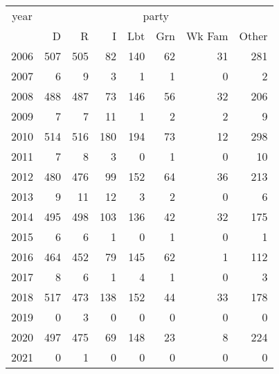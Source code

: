 \footnotesize\begin{tabular}[t]{lrrrrrrr}
\toprule
\multicolumn{1}{c}{year} & \multicolumn{7}{c}{party} \\
\cmidrule(l{3pt}r{3pt}){1-1} \cmidrule(l{3pt}r{3pt}){2-8}
  & D & R & I & Lbt & Grn & Wk Fam & Other\\
\midrule
2006 & 507 & 505 & 82 & 140 & 62 & 31 & 281\\
2007 & 6 & 9 & 3 & 1 & 1 & 0 & 2\\
2008 & 488 & 487 & 73 & 146 & 56 & 32 & 206\\
2009 & 7 & 7 & 11 & 1 & 2 & 2 & 9\\
2010 & 514 & 516 & 180 & 194 & 73 & 12 & 298\\
2011 & 7 & 8 & 3 & 0 & 1 & 0 & 10\\
2012 & 480 & 476 & 99 & 152 & 64 & 36 & 213\\
2013 & 9 & 11 & 12 & 3 & 2 & 0 & 6\\
2014 & 495 & 498 & 103 & 136 & 42 & 32 & 175\\
2015 & 6 & 6 & 1 & 0 & 1 & 0 & 1\\
2016 & 464 & 452 & 79 & 145 & 62 & 1 & 112\\
2017 & 8 & 6 & 1 & 4 & 1 & 0 & 3\\
2018 & 517 & 473 & 138 & 152 & 44 & 33 & 178\\
2019 & 0 & 3 & 0 & 0 & 0 & 0 & 0\\
2020 & 497 & 475 & 69 & 148 & 23 & 8 & 224\\
2021 & 0 & 1 & 0 & 0 & 0 & 0 & 0\\
\bottomrule
\end{tabular}
